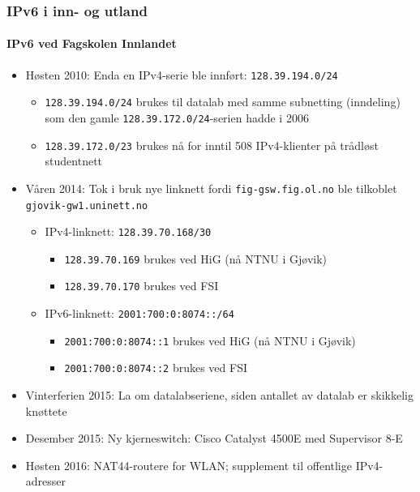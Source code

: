 \begin{frame}
  \frametitle{IPv6 i inn- og utland}
  \framesubtitle{IPv6 ved Fagskolen Innlandet}
  \begin{itemize}
  \item Høsten 2010: Enda en IPv4-serie ble innført:
    \texttt{128.39.194.0/24}
    \begin{itemize}
    \item \texttt{128.39.194.0/24} brukes til datalab med samme
      subnetting (inndeling) som den gamle
      \texttt{128.39.172.0/24}-serien hadde i 2006
    \item \texttt{128.39.172.0/\alert{23}} brukes nå for inntil 508
      IPv4-klienter på trådløst studentnett
    \end{itemize}
  \item Våren 2014: Tok i bruk nye linknett fordi
    \texttt{fig-gsw.fig.ol.no} ble tilkoblet
    \texttt{gjovik-gw1.uninett.no}
    \begin{itemize}
    \item IPv4-linknett: \texttt{128.39.70.168/30}
      \begin{itemize}
      \item \texttt{128.39.70.169} brukes ved HiG (nå NTNU i Gjøvik)
      \item \texttt{128.39.70.170} brukes ved FSI
      \end{itemize}
    \item IPv6-linknett: \texttt{2001:700:0:8074::/64}
      \begin{itemize}
      \item \texttt{2001:700:0:8074::1} brukes ved HiG (nå NTNU i Gjøvik)
      \item \texttt{2001:700:0:8074::2} brukes ved FSI
      \end{itemize}
    \end{itemize}
  \item Vinterferien 2015: La om datalabseriene, siden antallet av datalab
    er skikkelig knøttete
  \item Desember 2015: Ny kjerneswitch: Cisco Catalyst 4500E med Supervisor 8-E
  \item Høsten 2016: NAT44-routere for WLAN; supplement til offentlige
    IPv4-adresser
  \end{itemize}
\end{frame}


